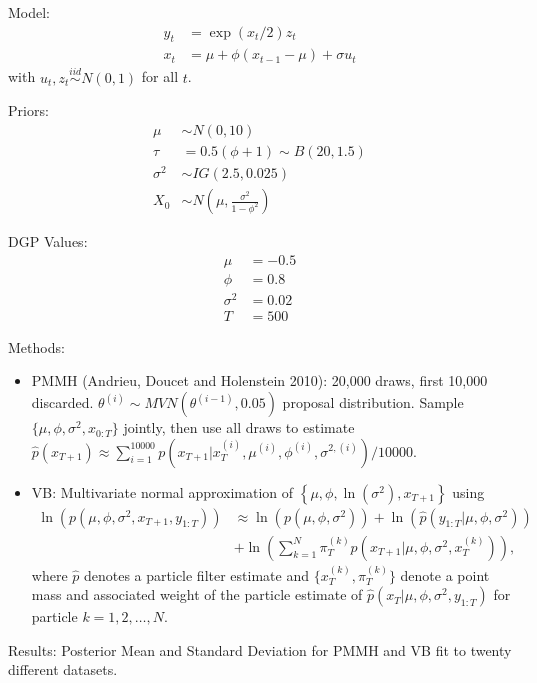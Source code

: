 \documentclass[12pt,a4paper]{article}%
\numberwithin{equation}{section}
\begin{document}
Model:
\begin{align*}
y_t &= \exp(x_t/2) z_t \\
x_t &= \mu + \phi (x_{t-1} - \mu) + \sigma u_t
\end{align*}
with $u_t, z_t \overset{iid}{\sim} N(0, 1)$ for all $t$.

Priors:
\begin{align*}
\mu &\sim N(0, 10) \\
\tau &= 0.5 (\phi + 1) \sim B(20, 1.5) \\
\sigma^2 &\sim IG(2.5, 0.025) \\
X_0 &\sim N\left(\mu, \frac{\sigma^2}{1 - \phi^2}\right)
\end{align*}

DGP Values:
\begin{align*}
\mu &= -0.5 \\
\phi &= 0.8 \\
\sigma^2 &= 0.02 \\
T &= 500
\end{align*}

Methods:
\begin{itemize}
\item PMMH (Andrieu, Doucet and Holenstein 2010): 20,000 draws, first 10,000 discarded. $\theta^{(i)} \sim MVN(\theta^{(i-1)}, 0.05)$ proposal distribution. Sample $\{\mu, \phi, \sigma^2, x_{0:T} \}$ jointly, then use all draws to estimate $\hat{p}(x_{T+1}) \approx \sum_{i=1}^10000 p(x_{T+1} | x_T^{(i)}, \mu^{(i)}, \phi^{(i)}, \sigma^{2,(i)}) / 10000$.
\item VB: Multivariate normal approximation of $\left\{\mu, \phi, \ln \left(\sigma^2\right), x_{T+1} \right\}$ using 
\begin{align*}
\ln(p(\mu, \phi, \sigma^2, x_{T+1}, y_{1:T})) &\approx \ln\left(p\left(\mu, \phi, \sigma^2\right)\right) + \ln \left(\hat{p}\left(y_{1:T} |\mu, \phi, \sigma^2\right)\right) \\
&+ \ln \left(\sum_{k=1}^N \pi_T^{(k)} p\left(x_{T+1} | \mu, \phi, \sigma^2, x_T^{(k)}\right)\right),
\end{align*}
where $\hat{p}$ denotes a particle filter estimate and $\{x_T^{(k)}, \pi_T^{(k)} \}$ denote a point mass and associated weight of the particle estimate of $\hat{p}(x_T | \mu, \phi, \sigma^2, y_{1:T})$ for particle $k = 1, 2, \dots, N$.
\end{itemize}

\newpage

Results: Posterior Mean and Standard Deviation for PMMH and VB fit to twenty different datasets.
\end{document}
